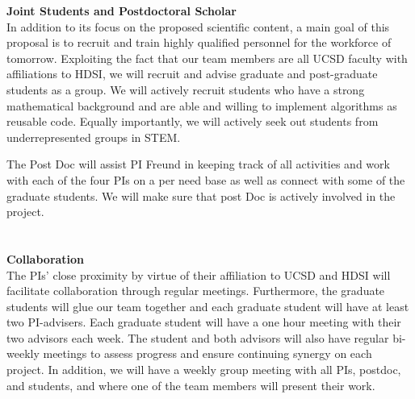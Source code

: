 \documentclass{article}
\begin{document}
%
%
\smallskip
{\bf Joint Students and Postdoctoral Scholar}\\
In addition to its focus on the proposed scientific content, a main goal of this proposal is to recruit and train highly qualified personnel for the workforce of tomorrow. Exploiting the fact that our team members are all UCSD faculty with affiliations to HDSI, we will recruit and advise graduate and post-graduate students as a
group. We will actively recruit students who have a strong
mathematical background and are able and willing to implement
algorithms as reusable code. Equally importantly, we will actively seek out students from underrepresented groups in STEM. 

The Post Doc will assist PI Freund in keeping track of all activities and work with each of the four PIs on a per need base as well as connect with some of the graduate students. We will make sure that post Doc is actively involved in the project.
\\
\\
\\
{\bf Collaboration}\\ %
The PIs' close proximity by virtue of their affiliation to UCSD and HDSI will facilitate collaboration through regular meetings. Furthermore, the graduate students will glue our team together and each graduate student will have at least two PI-advisers.  
Each graduate student will have a one hour meeting with their
two advisors each week. The student and both advisors will also have regular bi-weekly meetings to assess progress and ensure continuing synergy on each project.  In addition, we will have a weekly group meeting with all PIs, postdoc, and students, and where one of the team members will present their work. 
\end{document}
